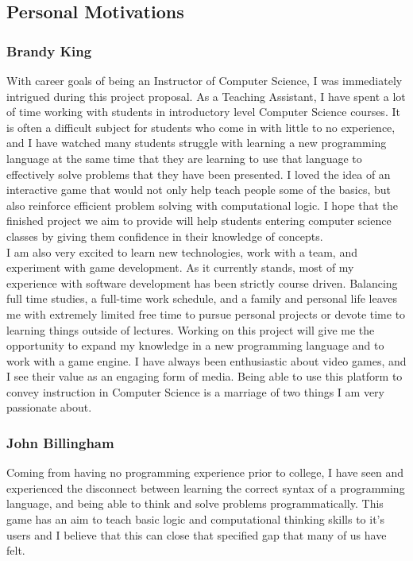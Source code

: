 \subsection{Personal Motivations}
\subsubsection{Brandy King}
With career goals of being an Instructor of Computer Science, I was immediately
intrigued during this project proposal. As a Teaching Assistant, I have spent a
lot of time working with students in introductory level Computer Science
courses. It is often a difficult subject for students who come in with little to
no experience, and I have watched many students struggle with learning a new
programming language at the same time that they are learning to use that
language to effectively solve problems that they have been presented. I loved
the idea of an interactive game that would not only help teach people some of
the basics, but also reinforce efficient problem solving with computational
logic. I hope that the finished project we aim to provide will help students
entering computer science classes by giving them confidence in their knowledge
of concepts.\\

I am also very excited to learn new technologies, work with a team, and
experiment with game development. As it currently stands, most of my experience
with software development has been strictly course driven. Balancing full time
studies, a full-time work schedule, and a family and personal life leaves me
with extremely limited free time to pursue personal projects or devote time to
learning things outside of lectures. Working on this project will give me the
opportunity to expand my knowledge in a new programming language and to work
with a game engine. I have always been enthusiastic about video games, and I see
their value as an engaging form of media. Being able to use this platform to
convey instruction in Computer Science is a marriage of two things I am very
passionate about.

\subsubsection{John Billingham}
Coming from having no programming experience prior to college, I have seen and
experienced the disconnect between learning the correct syntax of a programming
language, and being able to think and solve problems programmatically. This game
has an aim to teach basic logic and computational thinking skills to it’s users
and I believe that this can close that specified gap that many of us have felt.


